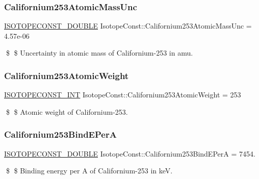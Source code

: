 \subsubsection{\texorpdfstring{Californium253\+Atomic\+Mass\+Unc}{Californium253AtomicMassUnc}}
{\footnotesize\ttfamily \mbox{\hyperlink{group___isotope_const-_macros_ga8f45a7272ce02c0b4c65c44636ed719a}{I\+S\+O\+T\+O\+P\+E\+C\+O\+N\+S\+T\+\_\+\+D\+O\+U\+B\+LE}} Isotope\+Const\+::\+Californium253\+Atomic\+Mass\+Unc = 4.\+57e-\/06}

\$ \$ Uncertainty in atomic mass of Californium-\/253 in amu. \mbox{\label{group___isotope_const-_californium-_cf253_gafdf2c17f274f639e131b887bdec34738}} 
\subsubsection{\texorpdfstring{Californium253\+Atomic\+Weight}{Californium253AtomicWeight}}
{\footnotesize\ttfamily \mbox{\hyperlink{group___isotope_const-_macros_ga5f18360b3e99483a35c32d789e62621c}{I\+S\+O\+T\+O\+P\+E\+C\+O\+N\+S\+T\+\_\+\+I\+NT}} Isotope\+Const\+::\+Californium253\+Atomic\+Weight = 253}

\$ \$ Atomic weight of Californium-\/253. \mbox{\label{group___isotope_const-_californium-_cf253_ga318265e8d5eedbde68a567ece3f7eb8c}} 
\subsubsection{\texorpdfstring{Californium253\+Bind\+E\+PerA}{Californium253BindEPerA}}
{\footnotesize\ttfamily \mbox{\hyperlink{group___isotope_const-_macros_ga8f45a7272ce02c0b4c65c44636ed719a}{I\+S\+O\+T\+O\+P\+E\+C\+O\+N\+S\+T\+\_\+\+D\+O\+U\+B\+LE}} Isotope\+Const\+::\+Californium253\+Bind\+E\+PerA = 7454.}

\$ \$ Binding energy per A of Californium-\/253 in keV. \mbox{\label{group___isotope_const-_californium-_cf253_ga69de522dd83c2a9a69000bc5d4535c7c}} 
